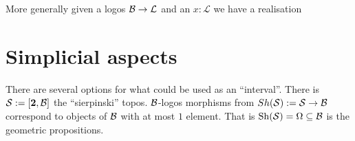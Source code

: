 \documentclass{article}
\begin{document}
More generally given a logos $\mathcal{B} \to \mathcal{L}$ and an $x : \mathcal{L}$ we 
have a realisation 

\section{Simplicial aspects}

There are several options for what could be used as an ``interval''.
There is $\mathcal{S} := [\mathbf{2}, \mathcal{B}]$ the ``sierpinski'' topos. 
$\mathcal{B}$-logos morphisms from $Sh(\mathcal{S}) := \mathcal{S} \to \mathcal{B}$ correspond to objects of $\mathcal{B}$ with at most $1$ element. 
That is $\mathrm{Sh}(\mathcal{S}) = \Omega \subseteq \mathcal{B}$ is the geometric propositions. 
\end{document}
